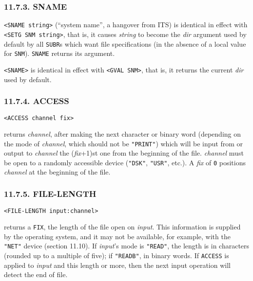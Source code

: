 \documentclass[a4paper,]{article}
\begin{document}
\subsubsection{11.7.3. SNAME}\label{sname}

\texttt{\textless{}SNAME\ string\textgreater{}}  (``system name'', a hangover from ITS) is
identical in effect with \texttt{\textless{}SETG\ SNM\ string\textgreater{}}, that is, it causes
\emph{string} to become the \emph{dir} argument used by default by all \texttt{SUBR}s which want file specifications (in
the absence of a local value for \texttt{SNM}). \texttt{SNAME} returns its argument.

\texttt{\textless{}SNAME\textgreater{}} is identical in effect with \texttt{\textless{}GVAL\ SNM\textgreater{}}, that is,
it returns the current \emph{dir} used by default.

\subsubsection{11.7.4. ACCESS}\label{access}

\begin{verbatim}
<ACCESS channel fix>
\end{verbatim}

 returns \emph{channel}, after making the next character or binary word (depending on the
mode of \emph{channel}, which should not be \texttt{"PRINT"}) which will be input from or output to \emph{channel} the
(\emph{fix}+1)st one from the beginning of the file. \emph{channel} must be open to a randomly accessible device
(\texttt{"DSK"}, \texttt{"USR"}, etc.). A \emph{fix} of \texttt{0} positions \emph{channel} at the beginning of the file.

\subsubsection{11.7.5. FILE-LENGTH}\label{file-length}

\begin{verbatim}
<FILE-LENGTH input:channel>
\end{verbatim}

 returns a \texttt{FIX}, the length of the file open on \emph{input}. This information
is supplied by the operating system, and it may not be available, for example, with the \texttt{"NET"} device (section
11.10). If \emph{input}'s mode is \texttt{"READ"}, the length is in characters (rounded up to a multiple of five); if
\texttt{"READB"}, in binary words. If \texttt{ACCESS} is applied to \emph{input} and this length or more, then the next
input operation will detect the end of file.
\end{document}
